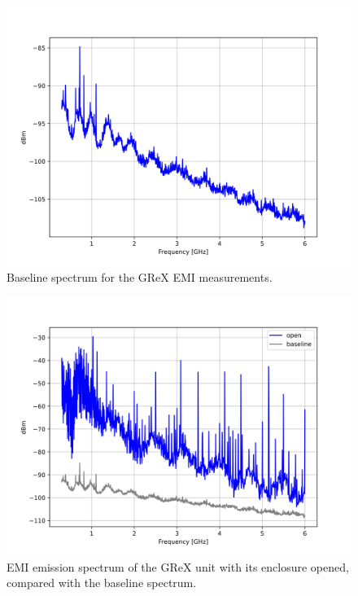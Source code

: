 \documentclass[12pt,a4paper,oneside]{article}
\begin{document}
\begin{figure}[H]
\centering
\includegraphics[width=0.9\linewidth]{Figures/baseline_spectrum.jpg}
\caption{Baseline spectrum for the GReX EMI measurements.}
\label{fig:baseline_result}
\end{figure}
%
\begin{figure}[H]
\centering
\includegraphics[width=0.9\linewidth]{Figures/open_comparison_spectrum.jpg}
\caption{EMI emission spectrum of the GReX unit with its enclosure opened, compared with the baseline spectrum.}
\label{fig:open_result}
\end{figure}
%
\end{document}
